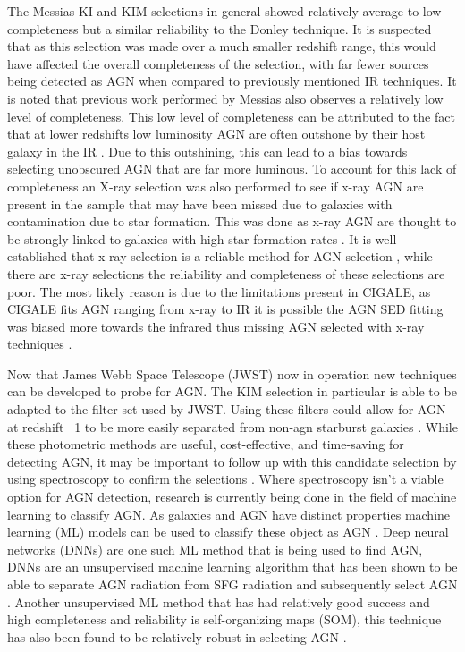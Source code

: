 \documentclass[11pt]{iopart}
\begin{document}
The Messias KI and KIM selections in general showed relatively average to low completeness but a similar reliability to the Donley technique. It is suspected that as this selection was made over a much smaller redshift range, this would have affected the overall completeness of the selection, with far fewer sources being detected as AGN when compared to previously mentioned IR techniques. It is noted that previous work performed by Messias \cite{messias_new_2012, messias_dependency_2014} also observes a relatively low level of completeness. This low level of completeness can be attributed to the fact that at lower redshifts low luminosity AGN are often outshone by their host galaxy in the IR \cite{messias_dependency_2014}. Due to this outshining, this can lead to a bias towards selecting unobscured AGN that are far more luminous. To account for this lack of completeness an X-ray selection was also performed to see if x-ray AGN are present in the sample that may have been missed due to galaxies with contamination due to star formation. This was done as x-ray AGN are thought to be strongly linked to galaxies with high star formation rates \cite{ehlert_x-ray_2014}. It is well established that x-ray selection is a reliable method for AGN selection \cite{lyu_agn_2022}, while there are x-ray selections the reliability and completeness of these selections are poor. The most likely reason is due to the limitations present in CIGALE, as CIGALE fits AGN ranging from x-ray to IR it is possible the AGN SED fitting was biased more towards the infrared thus missing AGN selected with x-ray techniques \cite{boquien_cigale_2019, yang_x-cigale_2020}. 

Now that James Webb Space Telescope (JWST) now in operation new techniques can be developed to probe for AGN. The KIM selection in particular is able to be adapted to the filter set used by JWST. Using these filters could allow for AGN at redshift ~1 to be more easily separated from non-agn starburst galaxies \cite{messias_dependency_2014}. While these photometric methods are useful, cost-effective, and time-saving for detecting AGN, it may be important to follow up with this candidate selection by using spectroscopy to confirm the selections \cite{hainline_spectroscopic_2014}. Where spectroscopy isn't a viable option for AGN detection, research is currently being done in the field of machine learning to classify AGN. As galaxies and AGN have distinct properties machine learning (ML) models can be used to classify these object as AGN \cite{chang_identifying_2021}. Deep neural networks (DNNs) are one such ML method that is being used to find AGN, DNNs are an unsupervised machine learning algorithm that has been shown to be able to separate AGN radiation from SFG radiation and subsequently select AGN \cite{chen_active_2021}. Another unsupervised ML method that has had relatively good success and high completeness and reliability is self-organizing maps (SOM), this technique has also been found to be relatively robust in selecting AGN \cite{faisst_how_2019}.
\end{document}
